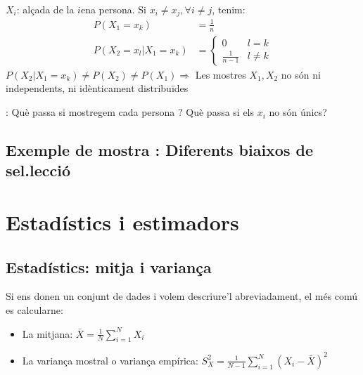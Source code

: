 \documentclass[letterpaper,10pt,english]{sphinxmanual}
\begin{document}
\(X_i\): alçada de la \(i\)\sphinxhyphen{}ena persona. Si \(x_i\neq x_j, \forall i\neq j\), tenim:
\begin{equation*}
\begin{split}P\left(X_1 = x_k\right)             &= \frac{1}{n} \\
P\left(X_2 = x_l | X_1 = x_k\right) &= \left\{\begin{array}{cc} 0 & l=k \\ \frac{1}{n-1} &l\neq k \end{array}\right.\end{split}
\end{equation*}
\(P\left(X_2 | X_1 = x_k\right) \neq P\left(X_2\right) \neq P\left(X_1\right) \Rightarrow\) Les mostres \(X_1, X_2\) no són ni independents, ni idènticament distribuïdes

:
\sphinxhyphen{} Què passa si mostregem cada persona ?
\sphinxhyphen{} Què passa si els \(x_i\) no són únics?


\subsection{Exemple de mostra : Diferents biaixos de sel.lecció}
\label{\detokenize{0_Intro/0_2_Intro_stats:exemple-de-mostra-no-iid-diferents-biaixos-de-sel-leccio}}

\section{Estadístics i estimadors}
\label{\detokenize{0_Intro/0_2_Intro_stats:estadistics-i-estimadors}}

\subsection{Estadístics: mitja i variança}
\label{\detokenize{0_Intro/0_2_Intro_stats:estadistics-mitja-i-varianca}}
Si ens donen un conjunt de dades i volem descriure’l abreviadament, el més comú es calcular\sphinxhyphen{}ne:
\begin{itemize}
\item {} 
La mitjana: \(\bar{X} = \frac{1}{N}\sum_{i=1}^N X_i\)

\item {} 
La variança mostral o variança empírica: \(S^2_X = \frac{1}{N-1}\sum_{i=1}^N \left(X_i -  \bar{X}\right)^2\)

\end{itemize}
\end{document}
